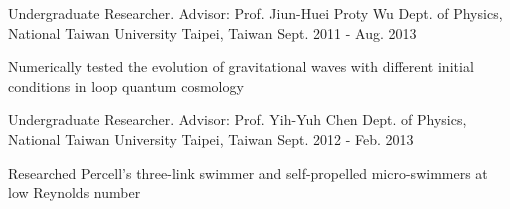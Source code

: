 \begin{cventries}

\vspace{-6mm}

\cventry
{Undergraduate Researcher. Advisor: Prof. Jiun-Huei Proty Wu} %
{Dept. of Physics, National Taiwan University} %
{Taipei, Taiwan} %
{Sept. 2011 - Aug. 2013} %
{ %
\begin{cvitems}
\item {Numerically tested the evolution of gravitational waves with different initial conditions in loop quantum cosmology}
\end{cvitems} 
}


\vspace{-6mm}

\cventry
{Undergraduate Researcher. Advisor: Prof. Yih-Yuh Chen} %
{Dept. of Physics, National Taiwan University} %
{Taipei, Taiwan} %
{Sept. 2012 - Feb. 2013} %
{ %
\begin{cvitems}
\item {Researched Percell’s three-link swimmer and self-propelled micro-swimmers at low Reynolds number}
\end{cvitems} 
}


\end{cventries}